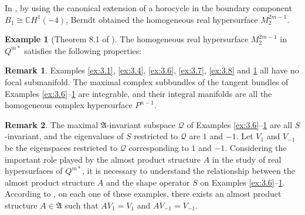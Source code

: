 \documentclass[reqno]{amsart}%
\theoremstyle{definition}
\newtheorem{example}[theorem]{Example}
\newtheorem{remark}{Remark}[section]
\numberwithin{equation}{section}
\begin{document}
In \cite{B-2023}, by using the canonical extension of a horocycle in the boundary component
$B_1\cong \mathbb{C}H^1(-4)$, Berndt obtained the homogeneous real hypersurface $M^{2m-1}_2$.



\begin{example}[Theorem 8.1 of \cite{B-2023}]\label{ex:3.10}
The homogeneous real hypersurface $M^{2m-1}_2$ in $Q^{m*}$ satisfies the following properties:
%
\end{example}

\begin{remark}\label{rem:3.1}
Examples \ref{ex:3.1}, \ref{ex:3.4}, \ref{ex:3.6}, \ref{ex:3.7}, \ref{ex:3.8} and \ref{ex:3.10}
all have no focal submanifold. The maximal complex
subbundles of the tangent bundles of Examples \ref{ex:3.6}--\ref{ex:3.10} are integrable, and their integral manifolds are all the homogeneous complex hypersurface $P^{n-1}$.
\end{remark}

\begin{remark}\label{rem:3.2}
The maximal $\mathfrak{A}$-invariant subspace $\mathcal{Q}$ of Examples \ref{ex:3.6}--\ref{ex:3.10} are all $S$-invariant, and the eigenvalues of $S$ restricted to $\mathcal{Q}$ are $1$ and $-1$. Let $V_1$ and $V_{-1}$ be the eigenspaces restricted to $\mathcal{Q}$ corresponding to $1$ and $-1$.
Considering the important role played by the almost product structure $A$ in the study of real hypersurfaces of $Q^{m*}$, it is necessary to understand the relationship between the almost product structure $A$ and the shape operator $S$ on Examples \ref{ex:3.6}--\ref{ex:3.10}.
According to \cite{B-2023}, on each one of these examples, there exists an almost product structure
$A\in\mathfrak{A}$ such that $AV_1=V_1$ and $AV_{-1}=V_{-1}$.
\end{remark}
\end{document}
